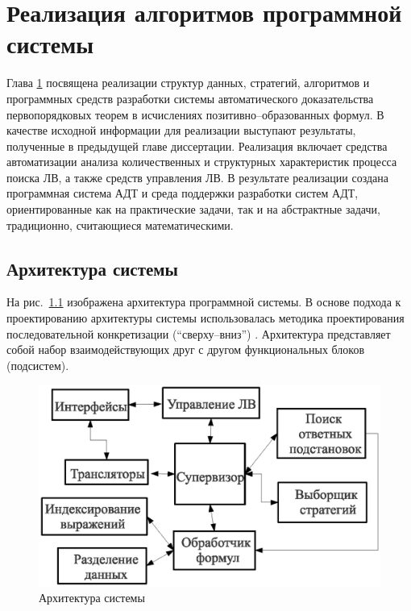 \chapter{Реализация алгоритмов программной системы}\label{part:three}

Глава \ref{part:three} посвящена реализации структур данных, стратегий, алгоритмов и программных средств разработки системы автоматического доказательства первопорядковых теорем в исчислениях позитивно--образованных формул. В качестве исходной информации для реализации выступают результаты, полученные в предыдущей главе диссертации. Реализация включает средства автоматизации анализа количественных и структурных характеристик процесса поиска ЛВ, а также средств управления ЛВ. В результате реализации создана программная система АДТ и среда поддержки разработки систем АДТ, ориентированные как на практические задачи, так и на абстрактные задачи, традиционно, считающиеся математическими.



\section{Архитектура системы}
На рис.~\ref{fig:design1} изображена архитектура программной системы. В основе подхода к проектированию архитектуры системы использовалась методика проектирования последовательной конкретизации (``сверху--вниз'') \cite{yodan}. Архитектура представляет собой набор взаимодействующих друг с другом функциональных блоков (подсистем).
\begin{figure}[h]
	\centering
	\includegraphics[width=0.7\linewidth]{pics/Design1.eps}
	\caption{Архитектура системы}
	\label{fig:design1}
\end{figure}


